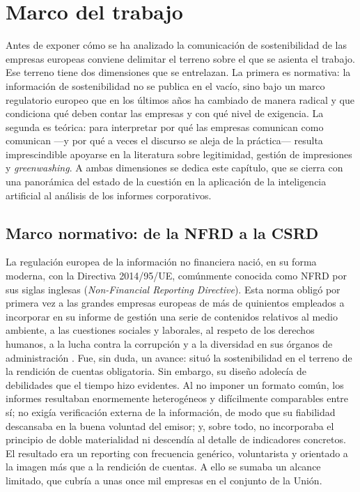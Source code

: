 \chapter{Marco del trabajo}
\label{cap:marco}

Antes de exponer cómo se ha analizado la comunicación de sostenibilidad de las empresas
europeas conviene delimitar el terreno sobre el que se asienta el trabajo. Ese terreno tiene
dos dimensiones que se entrelazan. La primera es normativa: la información de sostenibilidad
no se publica en el vacío, sino bajo un marco regulatorio europeo que en los últimos años ha
cambiado de manera radical y que condiciona qué deben contar las empresas y con qué nivel de
exigencia. La segunda es teórica: para interpretar por qué las empresas comunican como
comunican —y por qué a veces el discurso se aleja de la práctica— resulta imprescindible
apoyarse en la literatura sobre legitimidad, gestión de impresiones y \textit{greenwashing}.
A ambas dimensiones se dedica este capítulo, que se cierra con una panorámica del estado de la
cuestión en la aplicación de la inteligencia artificial al análisis de los informes
corporativos.

\section{Marco normativo: de la NFRD a la CSRD}
\label{sec:normativa}

La regulación europea de la información no financiera nació, en su forma moderna, con la
Directiva 2014/95/UE, comúnmente conocida como NFRD por sus siglas inglesas
(\textit{Non-Financial Reporting Directive}). Esta norma obligó por primera vez a las grandes
empresas europeas de más de quinientos empleados a incorporar en su informe de gestión una
serie de contenidos relativos al medio ambiente, a las cuestiones sociales y laborales, al
respeto de los derechos humanos, a la lucha contra la corrupción y a la diversidad en sus
órganos de administración \parencite{nfrd2014}. Fue, sin duda, un avance: situó la
sostenibilidad en el terreno de la rendición de cuentas obligatoria. Sin embargo, su diseño
adolecía de debilidades que el tiempo hizo evidentes. Al no imponer un formato común, los
informes resultaban enormemente heterogéneos y difícilmente comparables entre sí; no exigía
verificación externa de la información, de modo que su fiabilidad descansaba en la buena
voluntad del emisor; y, sobre todo, no incorporaba el principio de doble materialidad ni
descendía al detalle de indicadores concretos. El resultado era un reporting con frecuencia
genérico, voluntarista y orientado a la imagen más que a la rendición de cuentas. A ello se
sumaba un alcance limitado, que cubría a unas once mil empresas en el conjunto de la Unión.

